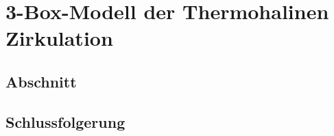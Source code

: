 %
%
%
\chapter{3-Box-Modell der Thermohalinen Zirkulation\label{chapter:thema}}
\begin{refsection}

\section{Abschnitt}

\section{Schlussfolgerung}

\printbibliography[heading=subbibliography]
\end{refsection}
